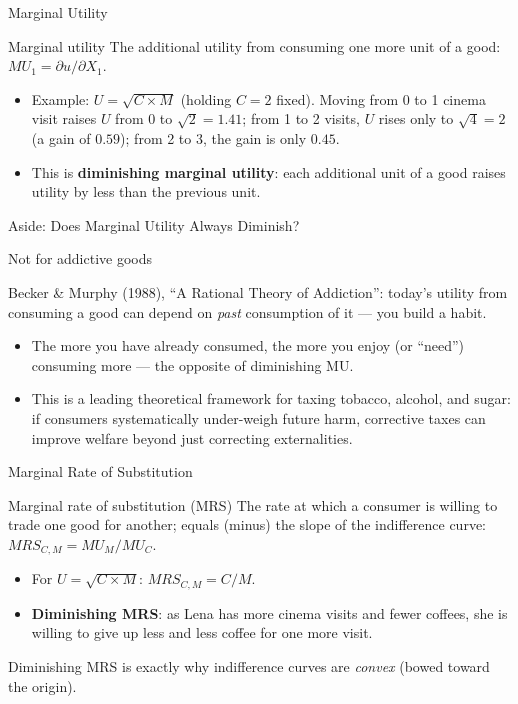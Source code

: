 \documentclass[11pt,aspectratio=169]{beamer}
\begin{document}
\begin{frame}{Marginal Utility}
  \begin{block}{Marginal utility}
    The additional utility from consuming one more unit of a good: $MU_1 = \partial u / \partial X_1$.
  \end{block}
  \begin{itemize}
    \item Example: $U = \sqrt{C \times M}$ (holding $C=2$ fixed). Moving from 0 to 1 cinema visit raises $U$ from 0 to $\sqrt{2}=1.41$; from 1 to 2 visits, $U$ rises only to $\sqrt{4}=2$ (a gain of $0.59$); from 2 to 3, the gain is only $0.45$.
    \item This is \textbf{diminishing marginal utility}: each additional unit of a good raises utility by less than the previous unit.
  \end{itemize}
\end{frame}

\begin{frame}{Aside: Does Marginal Utility Always Diminish?}
  \begin{alertblock}{Not for addictive goods}
    \end{alertblock}
    Becker \& Murphy (1988), ``A Rational Theory of Addiction'': today's utility from consuming a good can depend on \emph{past} consumption of it --- you build a habit.

  \begin{itemize}
    \item The more you have already consumed, the more you enjoy (or ``need'') consuming more --- the opposite of diminishing MU.
    \item This is a leading theoretical framework for taxing tobacco, alcohol, and sugar: if consumers systematically under-weigh future harm, corrective taxes can improve welfare beyond just correcting externalities.
  \end{itemize}
\end{frame}

\begin{frame}{Marginal Rate of Substitution}
  \begin{block}{Marginal rate of substitution (MRS)}
    The rate at which a consumer is willing to trade one good for another; equals (minus) the slope of the indifference curve: $MRS_{C,M} = MU_M / MU_C$.
  \end{block}
  \begin{itemize}
    \item For $U=\sqrt{C \times M}$: $MRS_{C,M} = C/M$.
    \item \textbf{Diminishing MRS}: as Lena has more cinema visits and fewer coffees, she is willing to give up less and less coffee for one more visit.
  \end{itemize}
  \vspace{0.3em}
  \centering
  Diminishing MRS is exactly why indifference curves are \emph{convex} (bowed toward the origin).
\end{frame}
\end{document}
